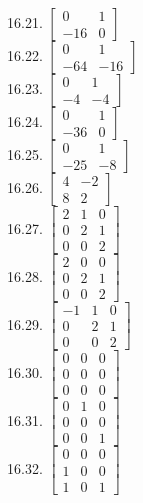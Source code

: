 \documentclass[10pt]{article}
\begin{document}
16.21. $\left[\begin{array}{rr}0 & 1 \\ -16 & 0\end{array}\right]$\\
16.22. $\left[\begin{array}{rr}0 & 1 \\ -64 & -16\end{array}\right]$\\
16.23. $\left[\begin{array}{rr}0 & 1 \\ -4 & -4\end{array}\right]$\\
16.24. $\left[\begin{array}{rr}0 & 1 \\ -36 & 0\end{array}\right]$\\
16.25. $\left[\begin{array}{rr}0 & 1 \\ -25 & -8\end{array}\right]$\\
16.26. $\left[\begin{array}{rr}4 & -2 \\ 8 & 2\end{array}\right]$\\
16.27. $\left[\begin{array}{lll}2 & 1 & 0 \\ 0 & 2 & 1 \\ 0 & 0 & 2\end{array}\right]$\\
16.28. $\left[\begin{array}{lll}2 & 0 & 0 \\ 0 & 2 & 1 \\ 0 & 0 & 2\end{array}\right]$\\
16.29. $\left[\begin{array}{rrr}-1 & 1 & 0 \\ 0 & 2 & 1 \\ 0 & 0 & 2\end{array}\right]$\\
16.30. $\left[\begin{array}{lll}0 & 0 & 0 \\ 0 & 0 & 0 \\ 0 & 0 & 0\end{array}\right]$\\
16.31. $\left[\begin{array}{lll}0 & 1 & 0 \\ 0 & 0 & 0 \\ 0 & 0 & 1\end{array}\right]$\\
16.32. $\left[\begin{array}{lll}0 & 0 & 0 \\ 1 & 0 & 0 \\ 1 & 0 & 1\end{array}\right]$
\end{document}
